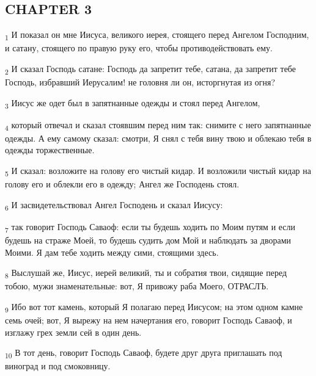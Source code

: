 \subsection{CHAPTER 3}
\begin{tcolorbox}
\textsubscript{1} И показал он мне Иисуса, великого иерея, стоящего перед Ангелом Господним, и сатану, стоящего по правую руку его, чтобы противодействовать ему.
\end{tcolorbox}
\begin{tcolorbox}
\textsubscript{2} И сказал Господь сатане: Господь да запретит тебе, сатана, да запретит тебе Господь, избравший Иерусалим! не головня ли он, исторгнутая из огня?
\end{tcolorbox}
\begin{tcolorbox}
\textsubscript{3} Иисус же одет был в запятнанные одежды и стоял перед Ангелом,
\end{tcolorbox}
\begin{tcolorbox}
\textsubscript{4} который отвечал и сказал стоявшим перед ним так: снимите с него запятнанные одежды. А ему самому сказал: смотри, Я снял с тебя вину твою и облекаю тебя в одежды торжественные.
\end{tcolorbox}
\begin{tcolorbox}
\textsubscript{5} И сказал: возложите на голову его чистый кидар. И возложили чистый кидар на голову его и облекли его в одежду; Ангел же Господень стоял.
\end{tcolorbox}
\begin{tcolorbox}
\textsubscript{6} И засвидетельствовал Ангел Господень и сказал Иисусу:
\end{tcolorbox}
\begin{tcolorbox}
\textsubscript{7} так говорит Господь Саваоф: если ты будешь ходить по Моим путям и если будешь на страже Моей, то будешь судить дом Мой и наблюдать за дворами Моими. Я дам тебе ходить между сими, стоящими здесь.
\end{tcolorbox}
\begin{tcolorbox}
\textsubscript{8} Выслушай же, Иисус, иерей великий, ты и собратия твои, сидящие перед тобою, мужи знаменательные: вот, Я привожу раба Моего, ОТРАСЛЪ.
\end{tcolorbox}
\begin{tcolorbox}
\textsubscript{9} Ибо вот тот камень, который Я полагаю перед Иисусом; на этом одном камне семь очей; вот, Я вырежу на нем начертания его, говорит Господь Саваоф, и изглажу грех земли сей в один день.
\end{tcolorbox}
\begin{tcolorbox}
\textsubscript{10} В тот день, говорит Господь Саваоф, будете друг друга приглашать под виноград и под смоковницу.
\end{tcolorbox}
